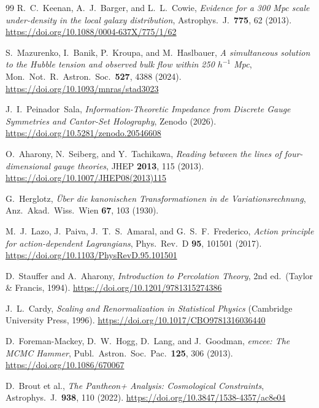 \documentclass[12pt,a4paper]{article}
\theoremstyle{plain}
\theoremstyle{definition}
\theoremstyle{remark}
\begin{document}
\begin{thebibliography}{99}
R.~C.~Keenan, A.~J.~Barger, and L.~L.~Cowie, 
\emph{Evidence for a 300 Mpc scale under-density in the local galaxy distribution}, 
Astrophys.\ J.\ \textbf{775}, 62 (2013). 
\url{https://doi.org/10.1088/0004-637X/775/1/62}


S.~Mazurenko, I.~Banik, P.~Kroupa, and M.~Haslbauer, 
\emph{A simultaneous solution to the Hubble tension and observed bulk flow within 250 $h^{-1}$ Mpc}, 
Mon.\ Not.\ R.\ Astron.\ Soc.\ \textbf{527}, 4388 (2024). 
\url{https://doi.org/10.1093/mnras/stad3023}

J.~I.~Peinador~Sala, 
\emph{Information-Theoretic Impedance from Discrete Gauge Symmetries and Cantor-Set Holography}, 
Zenodo (2026). 
\url{https://doi.org/10.5281/zenodo.20546608}

O.~Aharony, N.~Seiberg, and Y.~Tachikawa, 
\emph{Reading between the lines of four-dimensional gauge theories}, 
JHEP \textbf{2013}, 115 (2013). 
\url{https://doi.org/10.1007/JHEP08(2013)115}

G.~Herglotz, 
\emph{\"{U}ber die kanonischen Transformationen in de Variationsrechnung}, 
Anz.\ Akad.\ Wiss.\ Wien \textbf{67}, 103 (1930).

M.~J.~Lazo, J.~Paiva, J.~T.~S.~Amaral, and G.~S.~F.~Frederico, 
\emph{Action principle for action-dependent Lagrangians}, 
Phys.\ Rev.\ D \textbf{95}, 101501 (2017). 
\url{https://doi.org/10.1103/PhysRevD.95.101501}

D.~Stauffer and A.~Aharony, 
\emph{Introduction to Percolation Theory}, 
2nd ed.\ (Taylor \& Francis, 1994). 
\url{https://doi.org/10.1201/9781315274386}

J.~L.~Cardy, 
\emph{Scaling and Renormalization in Statistical Physics} 
(Cambridge University Press, 1996). 
\url{https://doi.org/10.1017/CBO9781316036440}

D.~Foreman-Mackey, D.~W.~Hogg, D.~Lang, and J.~Goodman, 
\emph{emcee: The MCMC Hammer}, 
Publ.\ Astron.\ Soc.\ Pac.\ \textbf{125}, 306 (2013). 
\url{https://doi.org/10.1086/670067}

D.~Brout et al., 
\emph{The Pantheon+ Analysis: Cosmological Constraints}, 
Astrophys.\ J.\ \textbf{938}, 110 (2022). 
\url{https://doi.org/10.3847/1538-4357/ac8e04}


\end{thebibliography}
\end{document}
